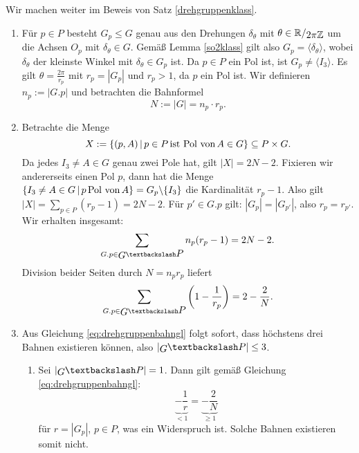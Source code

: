 \begin{beweis}
Wir machen weiter im Beweis von Satz \ref{drehgruppenklass}. 
\begin{enumerate}[2.]
\item Für $p \in P$ besteht $G_p \leq G$ genau aus den Drehungen $\delta_\theta$ mit $\theta \in \quotient{\R}{2\pi \Z}$ um die Achsen $O_p$ mit $\delta_\theta \in G$. Gemäß Lemma \ref{so2klass} gilt also $G_p = \langle \delta_\theta \rangle$, wobei $\delta_\theta$ der kleinste Winkel mit $\delta_\theta \in G_p$ ist. Da $p \in P$ ein Pol ist, ist $G_p \neq \langle I_3 \rangle$. Es gilt $\theta = \frac{2\pi}{r_p}$ mit $r_p = |G_p|$ und $r_p > 1$, da $p$ ein Pol ist. Wir definieren $n_p := |G.p|$ und betrachten die Bahnformel
\begin{equation}
N:=|G| = n_p \cdot r_p.
\end{equation}
\item Betrachte die Menge
\begin{equation}
X := \{(p,A)\,|\, p \in P \, \text{ist Pol von} \, A \in G\} \subseteq P \times G.
\end{equation}
Da jedes $I_3 \neq A \in G$ genau zwei Pole hat, gilt $|X| = 2N-2$. Fixieren wir andererseits einen Pol $p$, dann hat die Menge $\{I_3 \neq A \in G \, | \, p \, \text{Pol von} \, A \} = G_p \backslash \{I_3\}$ die Kardinalität $r_p-1$. Also gilt $|X| = \sum_{p \in P} (r_p -1) = 2N-2$. Für $p' \in G.p$ gilt: $|G_p| = |G_{p'}|$, also $r_p = r_{p'}$. Wir erhalten insgesamt:
\begin{equation}
\sum_{G.p \in \invquotient{G}{P}} n_p(r_p-1) = 2N-2.
\end{equation}
Division beider Seiten durch $N = n_pr_p$ liefert
\begin{equation}
\label{eq:drehgruppenbahngl}
\sum_{G.p \in \invquotient{G}{P}} \left(1- \frac{1}{r_p}\right) = 2-\frac{2}{N}.
\end{equation}
\item Aus Gleichung \ref{eq:drehgruppenbahngl} folgt sofort, dass höchstens drei Bahnen existieren können, also $\left|\invquotient{G}{P}\right| \leq 3$.
\begin{enumerate}[1. {Fall}:]
\item Sei $\left|\invquotient{G}{P}\right| =1$. Dann gilt gemäß Gleichung \ref{eq:drehgruppenbahngl}: 
\begin{equation}
\underbrace{-\frac{1}{r}}_{<1} = \underbrace{-\frac{2}{N}}_{\geq 1}
\end{equation}
für $r = |G_p|$, $p \in P$, was ein Widerspruch ist. Solche Bahnen existieren somit nicht.

\end{enumerate}
\end{enumerate}
\end{beweis}
